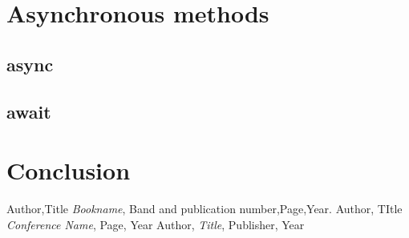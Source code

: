 \documentclass[11pt,a4paper,onecolumn]{IEEEtran}
\begin{document}
\section{Asynchronous methods}
\subsection{async}
\subsection{await}

\section{Conclusion}
\begin{thebibliography}{9}
   Author,Title \emph{Bookname}, Band and publication number,Page,Year.
   Author, TItle \emph{Conference Name}, Page, Year
   Author, \emph{Title}, Publisher, Year
\end{thebibliography}
\end{document}
